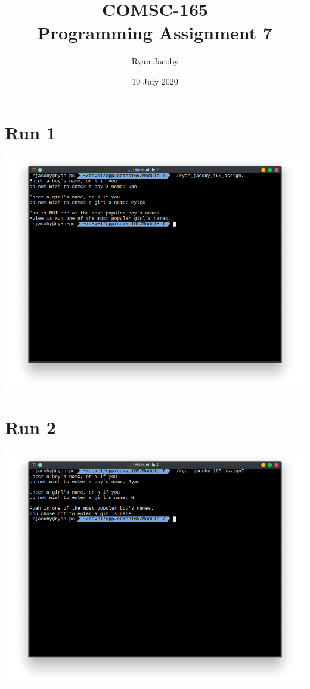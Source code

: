 \documentclass[letterpaper, 11pt]{article}
\title{COMSC-165 \\ Programming Assignment 7}
\author{Ryan Jacoby}
\date{10 July 2020}
\begin{document}
\maketitle

\section*{Run 1}
\includegraphics[scale=0.5]{run1.png}

\section*{Run 2}
\includegraphics[scale=0.5]{run2.png}
\end{document}
